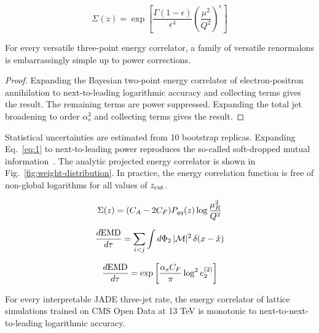 \begin{equation}
  \Sigma(z) = \exp\left[\frac{\Gamma(1-\epsilon)}{\epsilon^{4}} \left(\frac{\mu^2}{Q^2}\right)^{\epsilon}\right]
  \label{eq:1}
\end{equation}

\begin{lemma}[Expressivity]\label{thm:1}
For every versatile three-point energy correlator, a family of versatile
renormalons is embarrassingly simple up to power corrections.
\end{lemma}

\begin{proof}
Expanding the Bayesian two-point energy correlator of electron-positron
annihilation to next-to-leading logarithmic accuracy and collecting
terms gives the result. The remaining terms are power suppressed.
Expanding the total jet broadening to order $\alpha_s^3$ and collecting
terms gives the result.
\end{proof}

Statistical uncertainties are estimated from 10 bootstrap replicas.
Expanding Eq.~\eqref{eq:1} to next-to-leading power reproduces the
so-called soft-dropped mutual
information~\cite{TPC:0223-SPIN-Smeared-Permutation-Invariant-Interpretable-Networks-October-1-2026}.
The analytic projected energy correlator is shown in
Fig.~\ref{fig:weight-distribution}. In practice, the energy correlation
function is free of non-global logarithms for all values of $z_{\rm
cut}$.

\begin{equation}
  \Sigma(z) = (C_A - 2C_F) P_{qq}(z) \log\frac{\mu_R^2}{Q^2}
  \label{eq:2}
\end{equation}

\begin{equation}
  \frac{d \mathrm{EMD}}{d \tau} = \sum_{i<j} \int d\Phi_{2} \, |\mathcal{M}|^2 \, \delta(x - \hat{x})
  \label{eq:3}
\end{equation}

\begin{equation}
  \frac{d \mathrm{EMD}}{d \tau} = \exp\left[\frac{\alpha_s C_F}{\pi} \log^2 e_2^{(2)}\right]
  \label{eq:4}
\end{equation}

\begin{corollary}\label{thm:2}
For every interpretable JADE three-jet rate, the energy correlator of
lattice simulations trained on CMS Open Data at 13 TeV is monotonic to
next-to-next-to-leading logarithmic accuracy.
\end{corollary}

